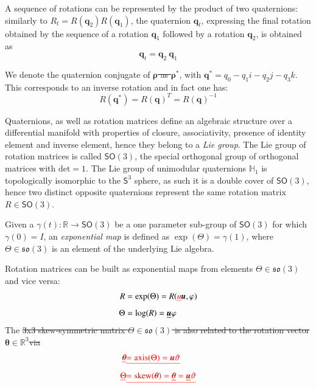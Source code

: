 \documentclass[preprint, 12pt]{elsarticle}
\def\vect#1{{\boldsymbol{#1}}}
\def\quat#1{{\boldsymbol{#1}}}
\def\amatr#1{{#1}}
\providecommand{\DIFadd}[1]{{\protect\color{blue}\uwave{#1}}} %
\providecommand{\DIFdel}[1]{{\protect\color{red}\sout{#1}}}                      %
\providecommand{\DIFaddbegin}{} %
\providecommand{\DIFaddend}{} %
\providecommand{\DIFdelbegin}{} %
\providecommand{\DIFdelend}{} %
\begin{document}
A sequence of rotations can be represented by the product of two quaternions:
similarly to $R_t=R(\quat{q}_{2}) R(\quat{q}_{1})$, the quaternion $\quat{q}_{t}$, expressing the final rotation obtained by the sequence of a rotation $\quat{q}_{1}$ followed by a rotation $\quat{q}_{2}$, is obtained as 
\begin{equation}
    \quat{q}_{t}=\quat{q}_{2}\: \quat{q}_{1}
\end{equation}

We denote the quaternion conjugate of \DIFdelbegin \DIFdel{$\quat{\rho}$ as $\quat{\rho}^*$}\DIFdelend \DIFaddbegin \DIFadd{$\quat{q}$ as $\quat{q}^*$}\DIFaddend , with $\quat{q}^*= q_0 - q_1 i  - q_2 j -  q_3 k$. This corresponds to an inverse rotation and in fact one has:
\begin{equation}
    \amatr{R}(\quat{q}^*) = \amatr{R}(\quat{q})^T = \amatr{R}(\quat{q})^{-1} 
\end{equation}

Quaternions, as well as rotation matrices define an algebraic structure over a differential manifold with properties of closure, associativity, presence of identity element and inverse element, hence they belong to a \textit{Lie group}. The Lie group of rotation matrices is called $\mathsf{SO}(3)$, the special orthogonal group of orthogonal matrices with $\text{det}=1$. The Lie group of unimodular quaternions $\mathbb{H}_1$ is topologically isomorphic to the $\mathsf{S}^3$ sphere, as such it is a double cover of $\mathsf{SO}(3)$, hence two distinct opposite quaternions represent the same rotation matrix $\amatr{R} \in \mathsf{SO}(3)$.

Given a $\gamma(t) : \mathbb{R} \rightarrow \mathsf{SO}(3)$ be a one parameter sub-group of $\mathsf{SO}(3)$ for which $\gamma(0) = I$, an \emph{exponential map} is defined as $\exp(\amatr{\Theta})=\gamma(1)$, where $\amatr{\Theta} \in \mathfrak{so}(3)$ is an element of the underlying Lie algebra. 

Rotation matrices can be built as exponential maps from elements $\amatr{\Theta} \in \mathfrak{so}(3)$ and vice versa:  
%
\begin{align}
\amatr{R}      &= \mathrm{exp}(\amatr{\Theta})=R(\DIFdelbegin \DIFdel{u}\DIFdelend \DIFaddbegin \vect{u}\DIFaddend ,\varphi) \label{Rexp}\\
\amatr{\Theta} &= \mathrm{log}(\amatr{R})=\underline{\vect{u}}\varphi \label{Rlog}
\end{align}
%
The \DIFdelbegin \DIFdel{3x3 skew-symmetric matrix $\amatr{\Theta} \in \mathfrak{so}(3)$ is also related to the rotation vector }\DIFdelend \DIFaddbegin \emph{\DIFadd{rotation vector}} \DIFaddend $\vect{\theta} \in \mathbb{R}^3$\DIFdelbegin \DIFdel{via 
}\begin{align*}
    \DIFdel{\vect{\theta} }&\DIFdel{= \text{axis}(\amatr{\Theta})=\vect{u}\vartheta }\\ 
    \DIFdel{\amatr{\Theta} }&\DIFdel{=  \mathrm{skew}(\vect{\theta}) = \underline{\vect{\theta}}=\underline{\vect{u}}\vartheta
}\end{align*}%
\end{document}

